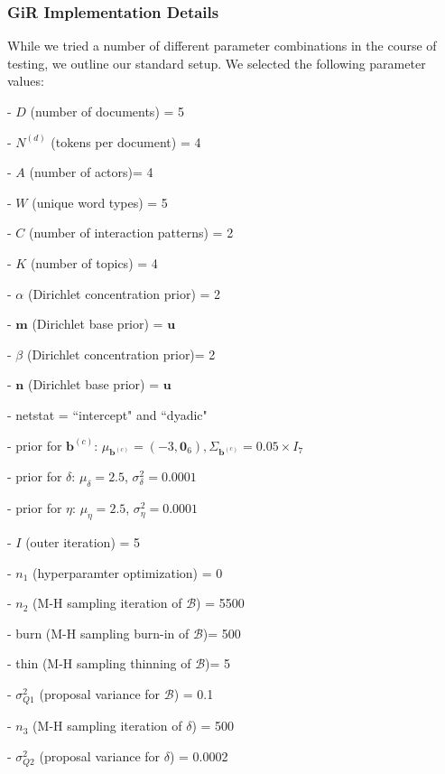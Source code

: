 \documentclass[a4paper]{article}
\begin{document}
        \subsubsection{GiR Implementation Details} \label{subsubsec: GiR implementation}
        While we tried a number of different parameter combinations in the course of testing, we outline our standard setup. We selected the following parameter values:
        \begin{itemize}
        	\begin{minipage}{0.49\textwidth}
        		\item[-] $D$ (number of documents) = 5
        		\item[-] $N^{(d)}$ (tokens per document) = 4
        		\item[-] $A$ (number of actors)= 4
        		\item[-] $W$ (unique word types) = 5
        		\item[-] $C$ (number of interaction patterns) = 2
        		\item[-] $K$ (number of topics) = 4
        		\item[-] $\alpha$ (Dirichlet concentration prior) = 2
        		\item[-] $\boldsymbol{m}$ (Dirichlet base prior) = $\boldsymbol{u}$ 
        		\item[-] $\beta$ (Dirichlet concentration prior)= 2
        		\item[-] $\boldsymbol{n}$ (Dirichlet base prior) = $\boldsymbol{u}$
        		\item[-] netstat = ``intercept" and ``dyadic"
        	\end{minipage}
        	\begin{minipage}{0.49\textwidth}
        		\item[-] prior for $\boldsymbol{b}^{(c)}$: $\mu_{\boldsymbol{b}^{(c)}} = (-3,\boldsymbol{0}_6), \Sigma_{\boldsymbol{b}^{(c)}} = 0.05\times I_7$
        		\item[-] prior for $\delta$: $\mu_\delta = 2.5$, $\sigma^2_\delta = 0.0001$
        		\item[-] prior for $\eta$: $\mu_\eta = 2.5$, $\sigma^2_\eta = 0.0001$
        		\item[-] $I$ (outer iteration) = 5
        		\item[-] $n_1$ (hyperparamter optimization) = 0
        		\item[-] $n_2$ (M-H sampling iteration of $\mathcal{B}$) = 5500
        		\item[-] burn (M-H sampling burn-in of $\mathcal{B}$)= 500
        		\item[-] thin (M-H sampling thinning of $\mathcal{B}$)= 5
        		\item[-] $\sigma_{Q1}^2$ (proposal variance for $\mathcal{B}$) = 0.1
        		\item[-] $n_3$ (M-H sampling iteration of $\delta$) = 500
        		\item[-] $\sigma_{Q2}^2$ (proposal variance for $\delta$) = 0.0002
        	\end{minipage}
        \end{itemize}        
                
\end{document}
